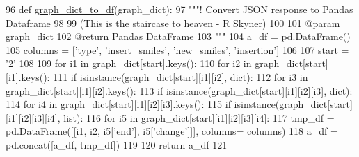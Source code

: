 \begin{DoxyCode}
96 \textcolor{keyword}{def }\hyperlink{namespacefragalysis__api_1_1xcanalyser_1_1graphcreator_a029a9d7dda209fb27d4268599330e8d3}{graph\_dict\_to\_df}(graph\_dict):
97     \textcolor{stringliteral}{"""! Convert JSON response to Pandas Dataframe}
98 \textcolor{stringliteral}{    }
99 \textcolor{stringliteral}{    (This is the staircase to heaven - R Skyner)}
100 \textcolor{stringliteral}{    }
101 \textcolor{stringliteral}{    @param graph\_dict }
102 \textcolor{stringliteral}{    @return Pandas DataFrame}
103 \textcolor{stringliteral}{    """}
104     a\_df = pd.DataFrame()
105     columns = [\textcolor{stringliteral}{'type'}, \textcolor{stringliteral}{'insert\_smiles'}, \textcolor{stringliteral}{'new\_smiles'}, \textcolor{stringliteral}{'insertion'}]
106 
107     start = \textcolor{stringliteral}{'2'}
108 
109     \textcolor{keywordflow}{for} i1 \textcolor{keywordflow}{in} graph\_dict[start].keys():
110         \textcolor{keywordflow}{for} i2 \textcolor{keywordflow}{in} graph\_dict[start][i1].keys():
111             \textcolor{keywordflow}{if} isinstance(graph\_dict[start][i1][i2], dict):
112                 \textcolor{keywordflow}{for} i3 \textcolor{keywordflow}{in} graph\_dict[start][i1][i2].keys():
113                     \textcolor{keywordflow}{if} isinstance(graph\_dict[start][i1][i2][i3], dict):
114                         \textcolor{keywordflow}{for} i4 \textcolor{keywordflow}{in} graph\_dict[start][i1][i2][i3].keys():
115                             \textcolor{keywordflow}{if} isinstance(graph\_dict[start][i1][i2][i3][i4], list):
116                                 \textcolor{keywordflow}{for} i5 \textcolor{keywordflow}{in} graph\_dict[start][i1][i2][i3][i4]:
117                                     tmp\_df = pd.DataFrame([[i1, i2, i5[\textcolor{stringliteral}{'end'}], i5[\textcolor{stringliteral}{'change'}]]], columns=
      columns)
118                                     a\_df = pd.concat([a\_df, tmp\_df])
119 
120     \textcolor{keywordflow}{return} a\_df
121 \end{DoxyCode}
\mbox{\label{namespacefragalysis__api_1_1xcanalyser_1_1graphcreator_a028827844f85500b1fab4ff79cc7718c}} 
